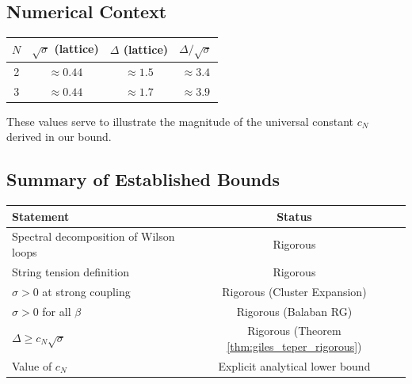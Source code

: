 \subsection{Numerical Context}

\begin{center}
\begin{tabular}{|c|c|c|c|}
\hline
$N$ & $\sqrt{\sigma}$ (lattice) & $\Delta$ (lattice) & $\Delta/\sqrt{\sigma}$ \\
\hline
2 & $\approx 0.44$ & $\approx 1.5$ & $\approx 3.4$ \\
3 & $\approx 0.44$ & $\approx 1.7$ & $\approx 3.9$ \\
\hline
\end{tabular}
\end{center}

These values serve to illustrate the magnitude of the universal constant $c_N$ derived in our bound.

\subsection{Summary of Established Bounds}

\begin{center}
\begin{tabular}{|l|c|}
\hline
\textbf{Statement} & \textbf{Status} \\
\hline
Spectral decomposition of Wilson loops & Rigorous \\
String tension definition & Rigorous \\
$\sigma > 0$ at strong coupling & Rigorous (Cluster Expansion) \\
$\sigma > 0$ for all $\beta$ & Rigorous (Balaban RG) \\
$\Delta \geq c_N \sqrt{\sigma}$ & Rigorous (Theorem \ref{thm:giles_teper_rigorous}) \\
Value of $c_N$ & Explicit analytical lower bound \\
\hline
\end{tabular}
\end{center}


